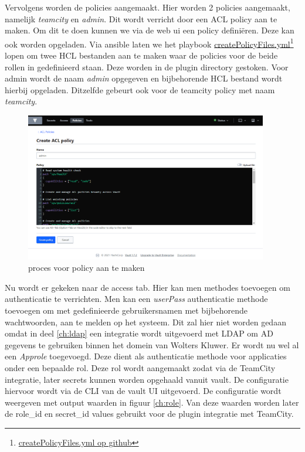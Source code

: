 Vervolgens worden de policies aangemaakt. Hier worden 2 policies aangemaakt, namelijk \textit{teamcity} en \textit{admin}. Dit wordt verricht door een ACL policy aan te maken. Om dit te doen kunnen we via de web ui een policy definiëren. Deze kan ook worden opgeladen. Via ansible laten we het playbook \href{https://github.com/Rayenasr/Secrets-management-thesis/blob/main/vault/createPolicyFiles.yml}{createPolicyFiles.yml}\footnote{\href{https://github.com/Rayenasr/Secrets-management-thesis/blob/main/vault/createPolicyFiles.yml}{createPolicyFiles.yml op github}} lopen om twee HCL bestanden aan te maken waar de policies voor de beide rollen in gedefinieerd staan. Deze worden in de plugin directory gestoken. Voor admin wordt de naam \textit{admin} opgegeven en bijbehorende HCL bestand wordt hierbij opgeladen. Ditzelfde gebeurt ook voor de teamcity policy met naam \textit{teamcity}.

\begin{figure}[htbp]
\centerline{\includegraphics[width=400]{bachproef/img/poc/acl policy.png}}
\caption{proces voor policy aan te maken \autocite{vault}}
\end{figure}

Nu wordt er gekeken naar de access tab. Hier kan men methodes toevoegen om authenticatie te verrichten. Men kan een \textit{userPass} authenticatie methode toevoegen om met gedefinieerde gebruikersnamen met bijbehorende wachtwoorden, aan te melden op het systeem. Dit zal hier niet worden gedaan omdat in deel \ref{ch:ldap} een integratie wordt uitgevoerd met LDAP om AD gegevens te gebruiken binnen het domein van Wolters Kluwer. Er wordt nu wel al een \textit{Approle} toegevoegd. Deze dient als authenticatie methode voor applicaties onder een bepaalde rol. Deze rol wordt aangemaakt zodat via de TeamCity integratie, later secrets kunnen worden opgehaald vanuit vault. De configuratie hiervoor wordt via de CLI van de vault UI uitgevoerd. De configuratie wordt weergeven met output waarden in figuur \ref{ch:role}. Van deze waarden worden later de role\_id en secret\_id values gebruikt voor de plugin integratie met TeamCity.
\newpage


